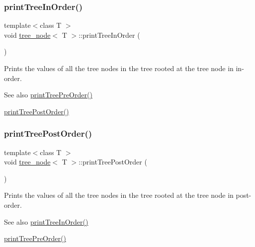 \subsubsection{\texorpdfstring{print\+Tree\+In\+Order()}{printTreeInOrder()}}
{\footnotesize\ttfamily template$<$class T $>$ \\
void \hyperlink{classtree__node}{tree\+\_\+node}$<$ T $>$\+::print\+Tree\+In\+Order (\begin{DoxyParamCaption}{ }\end{DoxyParamCaption})}

Prints the values of all the tree nodes in the tree rooted at the tree node in in-\/order. \begin{DoxySeeAlso}{See also}
\hyperlink{classtree__node_a2ca4e1521e6620bbe2418a9636a109a8}{print\+Tree\+Pre\+Order()} 

\hyperlink{classtree__node_a4bfdd2b618c15252fcfbeab46ca05861}{print\+Tree\+Post\+Order()} 
\end{DoxySeeAlso}
\mbox{\label{classtree__node_a4bfdd2b618c15252fcfbeab46ca05861}} 
\subsubsection{\texorpdfstring{print\+Tree\+Post\+Order()}{printTreePostOrder()}}
{\footnotesize\ttfamily template$<$class T $>$ \\
void \hyperlink{classtree__node}{tree\+\_\+node}$<$ T $>$\+::print\+Tree\+Post\+Order (\begin{DoxyParamCaption}{ }\end{DoxyParamCaption})}

Prints the values of all the tree nodes in the tree rooted at the tree node in post-\/order. \begin{DoxySeeAlso}{See also}
\hyperlink{classtree__node_ae87818a195621d4defc1cde67e7219ee}{print\+Tree\+In\+Order()} 

\hyperlink{classtree__node_a2ca4e1521e6620bbe2418a9636a109a8}{print\+Tree\+Pre\+Order()} 
\end{DoxySeeAlso}
\mbox{\label{classtree__node_a2ca4e1521e6620bbe2418a9636a109a8}} 
